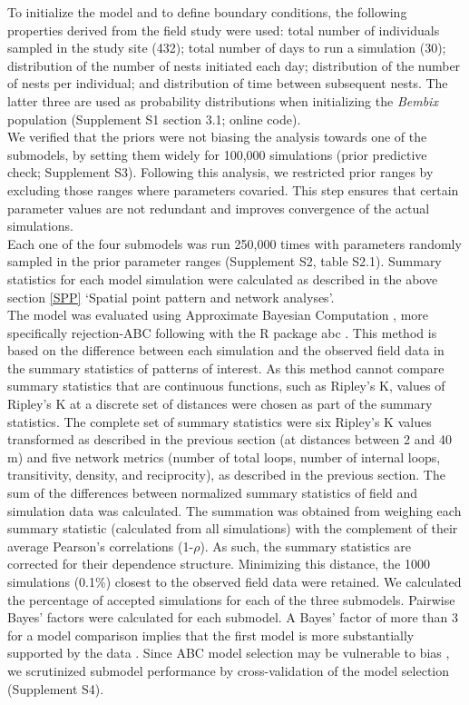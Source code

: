 \documentclass[10pt, twoside]{book} %
\begin{document}
	To initialize the model and to define boundary conditions, the following properties derived from the field study were used: total number of individuals sampled in the study site (432); total number of days to run a simulation (30); distribution of the number of nests initiated each day; distribution of the number of nests per individual; and distribution of time between subsequent nests. The latter three are used as probability distributions when initializing the \textit{Bembix} population (Supplement S1 section 3.1; online code).\\
	
	We verified that the priors were not biasing the analysis towards one of the submodels, by setting them widely for 100,000 simulations (prior predictive check; Supplement S3). Following this analysis, we restricted prior ranges by excluding those ranges where parameters covaried. This step ensures that certain parameter values are not redundant and improves convergence of the actual simulations.\\
	
	Each one of the four submodels was run 250,000 times with parameters randomly sampled in the prior parameter ranges (Supplement S2, table S2.1). Summary statistics for each model simulation were calculated as described in the above section \ref{SPP} `Spatial point pattern and network analyses'.\\
	
	The model was evaluated using Approximate Bayesian Computation \citep{csillery2010, beaumont2010, vandervaart2016}, more specifically rejection-ABC following \citet{vandervaart2015} with the R package abc \citep{csillery2012}. This method is based on the difference between each simulation and the observed field data in the summary statistics of patterns of interest. As this method cannot compare summary statistics that are continuous functions, such as Ripley's K, values of Ripley's K at a discrete set of distances were chosen as part of the summary statistics. The complete set of summary statistics were six Ripley's K values transformed as described in the previous section (at distances between 2 and 40 m) and five network metrics (number of total loops, number of internal loops, transitivity, density, and reciprocity), as described in the previous section. The sum of the differences between normalized summary statistics of field and simulation data was calculated. The summation was obtained from weighing each summary statistic (calculated from all simulations) with the complement of their average Pearson's correlations (1-$\rho$). As such, the summary statistics are corrected for their dependence structure. Minimizing this distance, the 1000 simulations (0.1$\%$) closest to the observed field data were retained. We calculated the percentage of accepted simulations for each of the three submodels. Pairwise Bayes' factors were calculated for each submodel. A Bayes' factor of more than 3 for a model comparison implies that the first model is more substantially supported by the data \citep{kass1995}. Since ABC model selection may be vulnerable to bias \citep{vandervaart2015}, we scrutinized submodel performance by cross-validation of the model selection (Supplement S4).\\
	
\end{document}
